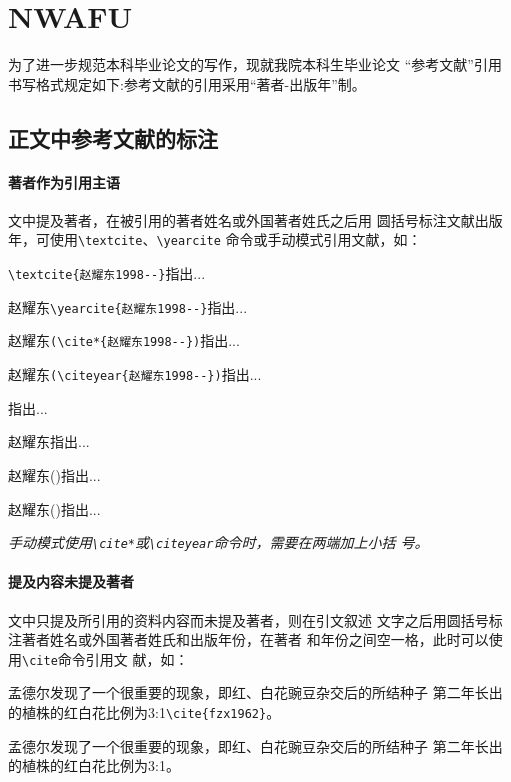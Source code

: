 \documentclass{article}
\newcommand\cs[1]{\texttt{\textbackslash#1}}
\newcommand{\note}[1]{{%
  \color{magenta}{\noindent\bfseries 注意：}\emph{#1}}}
\begin{document}
\section*{NWAFU}
为了进一步规范本科毕业论文的写作，现就我院本科生毕业论文
\enquote{参考文献}引用书写格式规定如下:参考文献的引用采用\enquote{著者-出版年}制。

\subsection{正文中参考文献的标注}
\paragraph{著者作为引用主语}
文中提及著者，在被引用的著者姓名或外国著者姓氏之后用
圆括号标注文献出版年，可使用\cs{textcite}、\cs{yearcite}
命令或手动模式引用文献，如：

\begin{center}
  \begin{minipage}{0.45\textwidth}
    \small
    \verb|\textcite{赵耀东1998--}|指出...

    赵耀东\verb|\yearcite{赵耀东1998--}|指出...

    赵耀东\verb|(\cite*{赵耀东1998--})|指出...

    赵耀东\verb|(\citeyear{赵耀东1998--})|指出...
  \end{minipage}
  \begin{boxedminipage}{0.45\textwidth}
    \small
    \textcite{赵耀东1998--}指出...

    赵耀东指出...

    赵耀东(\cite*{赵耀东1998--})指出...

    赵耀东(\citeyear{赵耀东1998--})指出...
  \end{boxedminipage}
\end{center}

\note{手动模式使用\cs{cite*}或\cs{citeyear}命令时，需要在两端加上小括
  号。}

\paragraph{提及内容未提及著者}

文中只提及所引用的资料内容而未提及著者，则在引文叙述
文字之后用圆括号标注著者姓名或外国著者姓氏和出版年份，在著者
和年份之间空一格，此时可以使用\cs{cite}命令引用文
献，如：

\begin{center}
  \begin{minipage}{0.45\textwidth}
    \small
    孟德尔发现了一个很重要的现象，即红、白花豌豆杂交后的所结种子
      第二年长出的植株的红白花比例为3:1\verb|\cite{fzx1962}|。%
  \end{minipage}
  \begin{boxedminipage}{0.45\textwidth}
    \small
    孟德尔发现了一个很重要的现象，即红、白花豌豆杂交后的所结种子
      第二年长出的植株的红白花比例为3:1\cite{fzx1962}。%
  \end{boxedminipage}
\end{center}
\end{document}
